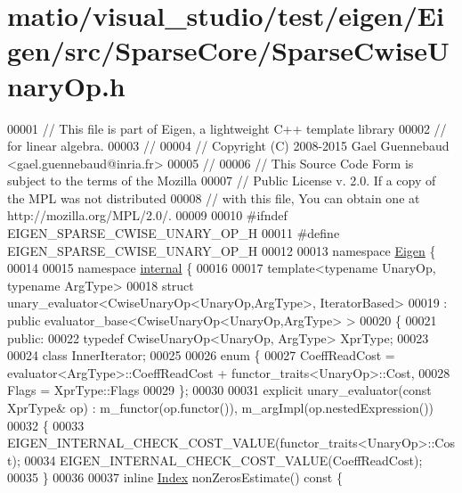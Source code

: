 \hypertarget{matio_2visual__studio_2test_2eigen_2_eigen_2src_2_sparse_core_2_sparse_cwise_unary_op_8h_source}{}\section{matio/visual\+\_\+studio/test/eigen/\+Eigen/src/\+Sparse\+Core/\+Sparse\+Cwise\+Unary\+Op.h}
\label{matio_2visual__studio_2test_2eigen_2_eigen_2src_2_sparse_core_2_sparse_cwise_unary_op_8h_source}

\begin{DoxyCode}
00001 \textcolor{comment}{// This file is part of Eigen, a lightweight C++ template library}
00002 \textcolor{comment}{// for linear algebra.}
00003 \textcolor{comment}{//}
00004 \textcolor{comment}{// Copyright (C) 2008-2015 Gael Guennebaud <gael.guennebaud@inria.fr>}
00005 \textcolor{comment}{//}
00006 \textcolor{comment}{// This Source Code Form is subject to the terms of the Mozilla}
00007 \textcolor{comment}{// Public License v. 2.0. If a copy of the MPL was not distributed}
00008 \textcolor{comment}{// with this file, You can obtain one at http://mozilla.org/MPL/2.0/.}
00009 
00010 \textcolor{preprocessor}{#ifndef EIGEN\_SPARSE\_CWISE\_UNARY\_OP\_H}
00011 \textcolor{preprocessor}{#define EIGEN\_SPARSE\_CWISE\_UNARY\_OP\_H}
00012 
00013 \textcolor{keyword}{namespace }\hyperlink{namespace_eigen}{Eigen} \{ 
00014 
00015 \textcolor{keyword}{namespace }\hyperlink{namespaceinternal}{internal} \{
00016   
00017 \textcolor{keyword}{template}<\textcolor{keyword}{typename} UnaryOp, \textcolor{keyword}{typename} ArgType>
00018 \textcolor{keyword}{struct }unary\_evaluator<CwiseUnaryOp<UnaryOp,ArgType>, IteratorBased>
00019   : \textcolor{keyword}{public} evaluator\_base<CwiseUnaryOp<UnaryOp,ArgType> >
00020 \{
00021   \textcolor{keyword}{public}:
00022     \textcolor{keyword}{typedef} CwiseUnaryOp<UnaryOp, ArgType> XprType;
00023 
00024     \textcolor{keyword}{class }InnerIterator;
00025     
00026     \textcolor{keyword}{enum} \{
00027       CoeffReadCost = evaluator<ArgType>::CoeffReadCost + functor\_traits<UnaryOp>::Cost,
00028       Flags = XprType::Flags
00029     \};
00030     
00031     \textcolor{keyword}{explicit} unary\_evaluator(\textcolor{keyword}{const} XprType& op) : m\_functor(op.functor()), m\_argImpl(op.nestedExpression())
00032     \{
00033       EIGEN\_INTERNAL\_CHECK\_COST\_VALUE(functor\_traits<UnaryOp>::Cost);
00034       EIGEN\_INTERNAL\_CHECK\_COST\_VALUE(CoeffReadCost);
00035     \}
00036     
00037     \textcolor{keyword}{inline} \hyperlink{namespace_eigen_a62e77e0933482dafde8fe197d9a2cfde}{Index} nonZerosEstimate()\textcolor{keyword}{ const }\{

\end{DoxyCode}
